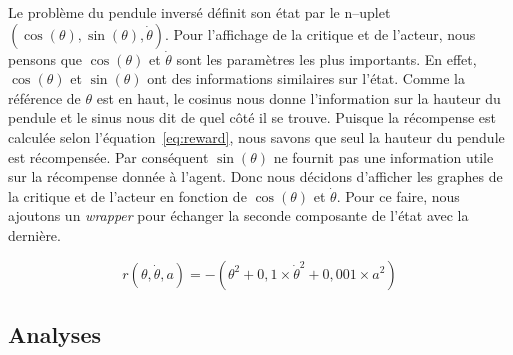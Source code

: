 Le problème du pendule inversé définit son état par le n--uplet $ (\cos(\theta), \sin(\theta), \dot{\theta}) $. Pour l'affichage de la critique et de l'acteur, nous pensons que $ \cos(\theta) $ et $ \dot{\theta} $ sont les paramètres les plus importants. En effet, $ \cos(\theta) $ et $ \sin(\theta) $ ont des informations similaires sur l'état. Comme la référence de $ \theta $ est en haut, le cosinus nous donne l'information sur la hauteur du pendule et le sinus nous dit de quel côté il se trouve. Puisque la récompense est calculée selon l'équation~\eqref{eq:reward}, nous savons que seul la hauteur du pendule est récompensée. Par conséquent $ \sin(\theta) $ ne fournit pas une information utile sur la récompense donnée à l'agent. Donc nous décidons d'afficher les graphes de la critique et de l'acteur en fonction de $ \cos(\theta) $ et $ \dot{\theta} $. Pour ce faire, nous ajoutons un \emph{wrapper} pour échanger la seconde composante de l'état avec la dernière.

\begin{equation}
    r(\theta, \dot{\theta}, a)= -(\theta^{2} + 0,1 \times \dot{\theta}^{2} + 0,001 \times a^{2})
    \label{eq:reward}
\end{equation}
 
\subsection{Analyses}
    
